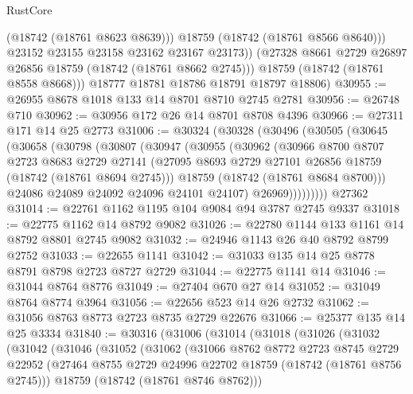 \begin{lexlean}{RustCore}
\begin{coremodule}
                (@18742 (@18761 @8623 @8639)))
              @18759
              (@18742 (@18761 @8566 @8640)))
            @23152
            @23155
            @23158
            @23162
            @23167
            @23173))
        (@27328 @8661 @2729 @26897 @26856 @18759 (@18742 (@18761 @8662 @2745)))
        @18759
        (@18742 (@18761 @8558 @8668)))
      @18777
      @18781
      @18786
      @18791
      @18797
      @18806)
@30955 := @26955 @8678 @1018 @133 @14 @8701 @8710 @2745 @2781
@30956 := @26748 @710
@30962 := @30956 @172 @26 @14 @8701 @8708 @4396
@30966 := @27311 @171 @14 @25 @2773
@31006 := @30324
    (@30328
      (@30496
        (@30505
          (@30645
            (@30658
              (@30798
                (@30807
                  (@30947
                    (@30955
                      (@30962
                        (@30966
                          @8700
                          @8707
                          @2723
                          @8683
                          @2729
                          @27141
                          (@27095 @8693 @2729 @27101 @26856 @18759 (@18742 (@18761 @8694 @2745)))
                          @18759
                          (@18742 (@18761 @8684 @8700)))
                        @24086
                        @24089
                        @24092
                        @24096
                        @24101
                        @24107)
                      @26969)))))))))
    @27362
@31014 := @22761 @1162 @1195 @104 @9084 @94 @3787 @2745 @9337
@31018 := @22775 @1162 @14 @8792 @9082
@31026 := @22780 @1144 @133 @1161 @14 @8792 @8801 @2745 @9082
@31032 := @24946 @1143 @26 @40 @8792 @8799 @2752
@31033 := @22655 @1141
@31042 := @31033 @135 @14 @25 @8778 @8791 @8798 @2723 @8727 @2729
@31044 := @22775 @1141 @14
@31046 := @31044 @8764 @8776
@31049 := @27404 @670 @27 @14
@31052 := @31049 @8764 @8774 @3964
@31056 := @22656 @523 @14 @26 @2732
@31062 := @31056 @8763 @8773 @2723 @8735 @2729 @22676
@31066 := @25377 @135 @14 @25 @3334
@31840 := @30316
    (@31006
      (@31014
        (@31018
          (@31026
            (@31032
              (@31042
                (@31046
                  (@31052
                    (@31062
                      (@31066
                        @8762
                        @8772
                        @2723
                        @8745
                        @2729
                        @22952
                        (@27464 @8755 @2729 @24996 @22702 @18759 (@18742 (@18761 @8756 @2745)))
                        @18759
                        (@18742 (@18761 @8746 @8762)))

\end{coremodule}
\end{lexlean}
